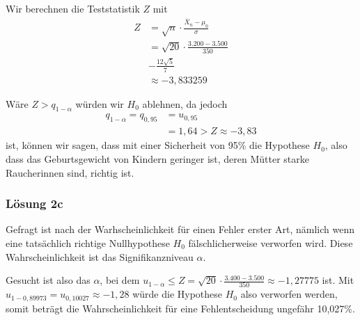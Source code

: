 \documentclass[main.tex]{subfiles}
\begin{document}
Wir berechnen die Teststatistik $Z$ mit
$$\begin{aligned}
	Z &= \sqrt{n} \cdot \frac{\overline{X}_n - \mu_0}{\sigma} \\[2mm]
    &= \sqrt{20} \cdot \frac{3.200 - 3.500}{350} \\[2mm]
    & -\frac{12\sqrt{5}}{7} \\[2mm]
    &\approx -3,833259
\end{aligned}$$

Wäre $Z > q_{1-\alpha}$ würden wir $H_0$ ablehnen, da jedoch 
$$\begin{aligned}
q_{1-\alpha} = q_{0,95} &= u_{0,95} \\
&= 1,64  > Z \approx - 3,83
\end{aligned}$$
ist, können wir sagen, dass mit einer Sicherheit von 95\% die Hypothese $H_0$, also dass das Geburtsgewicht von Kindern geringer ist, deren Mütter starke Raucherinnen sind, richtig ist.

\subsubsection{Lösung 2c}
Gefragt ist nach der Warhscheinlichkeit für einen Fehler erster Art, nämlich wenn eine tatsächlich richtige Nullhypothese $H_0$ fälschlicherweise verworfen wird. Diese Wahrscheinlichkeit ist das Signifikanzniveau $\alpha$.

Gesucht ist also das $\alpha$, bei dem $u_{1-\alpha} \leq Z = \sqrt{20}\cdot \frac{3.400 - 3.500}{350} \approx -1,27775$ ist. 
Mit $u_{1-0,89973} = u_{0,10027} \approx -1,28$ würde die Hypothese $H_0$ also verworfen werden, somit beträgt die Wahrscheinlichkeit für eine Fehlentscheidung ungefähr 10,027\%. 
\end{document}
